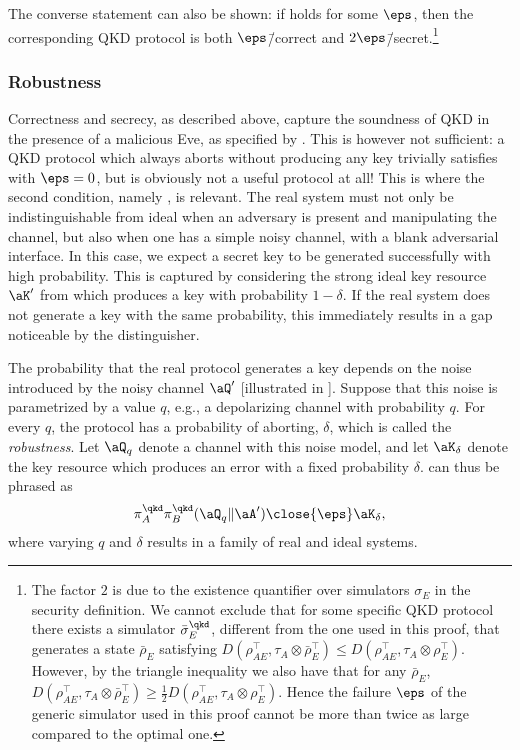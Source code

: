 The converse statement can also be shown: if  holds for some $\eps$, then the corresponding QKD protocol is both $\eps$\=/correct and $2\eps$\=/secret.\footnote{The factor $2$ is due to the existence quantifier over simulators $\sigma_E$ in the security definition. We cannot exclude that for some specific QKD protocol there exists a  simulator $\bar{\sigma}^\qkd_E$, different from the one used in this proof, that generates a   state $\bar{\rho}_E$ satisfying   $D\left(\rho^{\top}_{AE},\tau_{A} \otimes \bar{\rho}^{\top}_E\right)   \leq D\left(\rho^{\top}_{AE},\tau_{A} \otimes \rho^{\top}_E\right)$.   However, by the triangle inequality we also have that for any   $\bar{\rho}_E$,   $D\left(\rho^{\top}_{AE},\tau_{A} \otimes \bar{\rho}^{\top}_E\right)  \geq \frac{1}{2} D\left(\rho^{\top}_{AE},\tau_{A} \otimes     \rho^{\top}_E\right)$.  Hence the failure $\eps$ of the generic simulator used in this proof   cannot be more than twice as large compared to the optimal one.}


\subsubsection{Robustness}
\label{sec:security.rob}

Correctness and secrecy, as described above, capture the soundness of QKD in the presence of a
malicious Eve, as specified by
.  This is however not sufficient: a QKD protocol which
always aborts without producing any key trivially satisfies
 with $\eps=0$, but is obviously not a useful
protocol at all! This is where the second condition, namely
, is relevant. The real system must not only be
indistinguishable from ideal when an adversary is present and
manipulating the channel, but also when one has a simple noisy
channel, with a blank adversarial interface. In this case, we expect a
secret key to be generated successfully with high probability. This is
captured by considering the strong ideal key resource $\aK'$ from
 which produces a key with
probability $1-\delta$. If the real system does not generate a key
with the same probability, this immediately results in a gap
noticeable by the distinguisher.

The probability that the real protocol generates a key depends on the
noise introduced by the noisy channel $\aQ'$ [illustrated in
]. Suppose that this noise is parametrized
by a value $q$, e.g., a depolarizing channel with probability $q$. For
every $q$, the protocol has a probability of aborting, $\delta$, which
is called the \emph{robustness}. Let $\aQ_q$ denote a channel with
this noise model, and let $\aK_\delta$ denote the key resource which
produces an error with a fixed probability
$\delta$.  can thus be phrased as
\begin{equation} \label{eq:robustness} \pi_A^{\qkd}\pi_B^{\qkd}(\aQ_q \|
  \aA') \close{\eps} \aK_\delta
  ,\end{equation} 
  where varying $q$ and $\delta$ results in a family of real and ideal systems.

